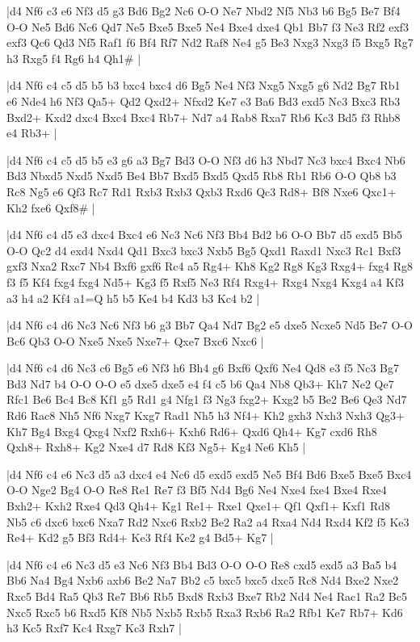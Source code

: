 \whitename{}
\blackname{}
\makegametitle
|d4 Nf6 c3 e6 Nf3 d5 g3 Bd6 Bg2 Nc6 O-O Ne7 Nbd2 Nf5 Nb3 b6 Bg5 Be7 Bf4 O-O Ne5 Bd6 Nc6 Qd7 Ne5 Bxe5 Bxe5 Ne4 Bxe4 dxe4 Qb1 Bb7 f3 Ne3 Rf2 exf3 exf3 Qc6 Qd3 Nf5 Raf1 f6 Bf4 Rf7 Nd2 Raf8 Ne4 g5 Be3 Nxg3 Nxg3 f5 Bxg5 Rg7 h3 Rxg5 f4 Rg6 h4 Qh1\#  |

\whitename{}
\blackname{}
\makegametitle
|d4 Nf6 c4 c5 d5 b5 b3 bxc4 bxc4 d6 Bg5 Ne4 Nf3 Nxg5 Nxg5 g6 Nd2 Bg7 Rb1 e6 Nde4 h6 Nf3 Qa5+ Qd2 Qxd2+ Nfxd2 Ke7 e3 Ba6 Bd3 exd5 Nc3 Bxc3 Rb3 Bxd2+ Kxd2 dxc4 Bxc4 Bxc4 Rb7+ Nd7 a4 Rab8 Rxa7 Rb6 Kc3 Bd5 f3 Rhb8 e4 Rb3+  |

\whitename{}
\blackname{}
\makegametitle
|d4 Nf6 c4 c5 d5 b5 e3 g6 a3 Bg7 Bd3 O-O Nf3 d6 h3 Nbd7 Nc3 bxc4 Bxc4 Nb6 Bd3 Nbxd5 Nxd5 Nxd5 Be4 Bb7 Bxd5 Bxd5 Qxd5 Rb8 Rb1 Rb6 O-O Qb8 b3 Rc8 Ng5 e6 Qf3 Rc7 Rd1 Rxb3 Rxb3 Qxb3 Rxd6 Qc3 Rd8+ Bf8 Nxe6 Qxc1+ Kh2 fxe6 Qxf8\#  |

\whitename{}
\blackname{}
\makegametitle
|d4 Nf6 c4 d5 e3 dxc4 Bxc4 e6 Nc3 Nc6 Nf3 Bb4 Bd2 b6 O-O Bb7 d5 exd5 Bb5 O-O Qc2 d4 exd4 Nxd4 Qd1 Bxc3 bxc3 Nxb5 Bg5 Qxd1 Raxd1 Nxc3 Rc1 Bxf3 gxf3 Nxa2 Rxc7 Nb4 Bxf6 gxf6 Rc4 a5 Rg4+ Kh8 Kg2 Rg8 Kg3 Rxg4+ fxg4 Rg8 f3 f5 Kf4 fxg4 fxg4 Nd5+ Kg3 f5 Rxf5 Ne3 Rf4 Rxg4+ Rxg4 Nxg4 Kxg4 a4 Kf3 a3 h4 a2 Kf4 a1=Q h5 b5 Ke4 b4 Kd3 b3 Kc4 b2  |

\whitename{}
\blackname{}
\makegametitle
|d4 Nf6 c4 d6 Nc3 Nc6 Nf3 b6 g3 Bb7 Qa4 Nd7 Bg2 e5 dxe5 Ncxe5 Nd5 Be7 O-O Bc6 Qb3 O-O Nxe5 Nxe5 Nxe7+ Qxe7 Bxc6 Nxc6  |

\whitename{}
\blackname{}
\makegametitle
|d4 Nf6 c4 d6 Nc3 c6 Bg5 e6 Nf3 h6 Bh4 g6 Bxf6 Qxf6 Ne4 Qd8 e3 f5 Nc3 Bg7 Bd3 Nd7 b4 O-O O-O e5 dxe5 dxe5 e4 f4 c5 b6 Qa4 Nb8 Qb3+ Kh7 Ne2 Qe7 Rfc1 Be6 Bc4 Bc8 Kf1 g5 Rd1 g4 Nfg1 f3 Ng3 fxg2+ Kxg2 b5 Be2 Be6 Qe3 Nd7 Rd6 Rac8 Nh5 Nf6 Nxg7 Kxg7 Rad1 Nh5 h3 Nf4+ Kh2 gxh3 Nxh3 Nxh3 Qg3+ Kh7 Bg4 Bxg4 Qxg4 Nxf2 Rxh6+ Kxh6 Rd6+ Qxd6 Qh4+ Kg7 cxd6 Rh8 Qxh8+ Rxh8+ Kg2 Nxe4 d7 Rd8 Kf3 Ng5+ Kg4 Ne6 Kh5  |

\whitename{}
\blackname{}
\makegametitle
|d4 Nf6 c4 e6 Nc3 d5 a3 dxc4 e4 Nc6 d5 exd5 exd5 Ne5 Bf4 Bd6 Bxe5 Bxe5 Bxc4 O-O Nge2 Bg4 O-O Re8 Re1 Re7 f3 Bf5 Nd4 Bg6 Ne4 Nxe4 fxe4 Bxe4 Rxe4 Bxh2+ Kxh2 Rxe4 Qd3 Qh4+ Kg1 Re1+ Rxe1 Qxe1+ Qf1 Qxf1+ Kxf1 Rd8 Nb5 c6 dxc6 bxc6 Nxa7 Rd2 Nxc6 Rxb2 Be2 Ra2 a4 Rxa4 Nd4 Rxd4 Kf2 f5 Ke3 Re4+ Kd2 g5 Bf3 Rd4+ Ke3 Rf4 Ke2 g4 Bd5+ Kg7  |

\whitename{}
\blackname{}
\makegametitle
|d4 Nf6 c4 e6 Nc3 d5 e3 Nc6 Nf3 Bb4 Bd3 O-O O-O Re8 cxd5 exd5 a3 Ba5 b4 Bb6 Na4 Bg4 Nxb6 axb6 Be2 Na7 Bb2 c5 bxc5 bxc5 dxc5 Rc8 Nd4 Bxe2 Nxe2 Rxc5 Bd4 Ra5 Qb3 Re7 Bb6 Rb5 Bxd8 Rxb3 Bxe7 Rb2 Nd4 Ne4 Rac1 Ra2 Bc5 Nxc5 Rxc5 b6 Rxd5 Kf8 Nb5 Nxb5 Rxb5 Rxa3 Rxb6 Ra2 Rfb1 Ke7 Rb7+ Kd6 h3 Kc5 Rxf7 Kc4 Rxg7 Kc3 Rxh7  |

